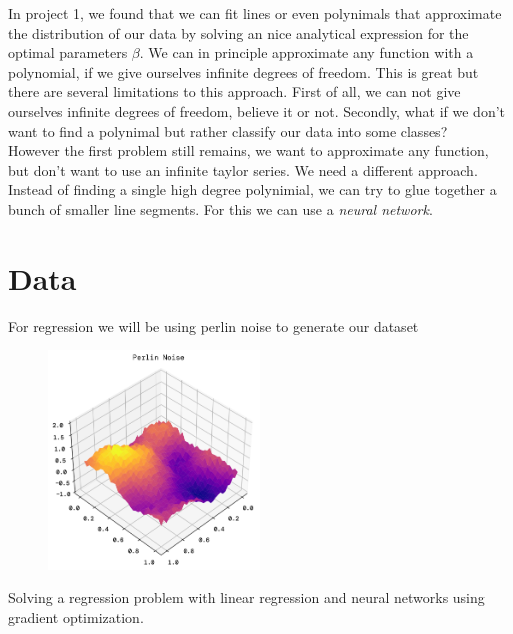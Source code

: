 \documentclass[twoside,11pt]{report}
\begin{document}
    In project 1\cite{MachineLearningProjects_2023}, we found that 
    we can fit lines or even polynimals that approximate the distribution of our data by solving an nice 
    analytical expression for the optimal parameters $\beta$. We can in principle approximate 
    any function with a polynomial, if we give ourselves infinite degrees of freedom. This is great but there are several
    limitations to this approach. First of all, we can not give ourselves infinite degrees of freedom, believe it or not.
    Secondly, what if we don't want to find a polynimal but rather classify our data into some classes?\\
    However the first problem
    still remains, we want to approximate any function, but don't want to use an infinite taylor series. 
    We need a different approach.
    Instead of finding a single high degree polynimial, we can try to glue together a bunch of smaller line segments.
    For this we can use a \emph{neural network}.


\section*{Data}

    For regression we will be using perlin noise to generate our dataset 

    \begin{figure}
        \begin{center}
            \includegraphics[width=0.5\textwidth]{../runsAndFigures/perlinNoise.png}
        \end{center}
        \caption{}\label{fig:perlin}
    \end{figure}

    Solving a regression problem with linear regression and neural networks using gradient optimization.
\end{document}
